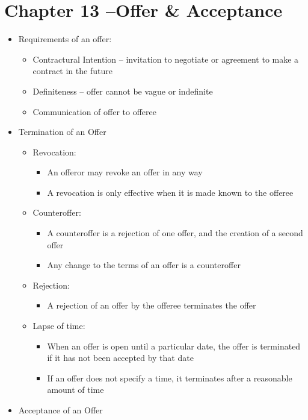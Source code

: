 \documentclass{article}
\begin{document}
	\section{Chapter 13 --Offer \& Acceptance}
	\begin{itemize}
		\item Requirements of an offer:
		\begin{itemize}
			\item Contractural Intention -- invitation to negotiate or agreement to make a contract in the future
			\item Definiteness -- offer cannot be vague or indefinite
			\item Communication of offer to offeree
		\end{itemize}
		\item Termination of an Offer
		\begin{itemize}
			\item Revocation:
			\begin{itemize}
				\item An offeror may revoke an offer in any way
				\item A revocation is only effective when it is made known to the offeree
			\end{itemize}	
			\item Counteroffer:
			\begin{itemize}
				\item A counteroffer is a rejection of one offer, and the creation of a second offer
				\item Any change to the terms of an offer is a counteroffer
			\end{itemize}	
			\item Rejection:
			\begin{itemize}
				\item A rejection of an offer by the offeree terminates the offer
			\end{itemize}
			\item Lapse of time:			
			\begin{itemize}
				\item When an offer is open until a particular date, the offer is terminated if it has not been accepted by that date
				\item If an offer does not specify a time, it terminates after a reasonable amount of time
			\end{itemize}
		\end{itemize}
		\item Acceptance of an Offer

\end{itemize}
\end{document}
